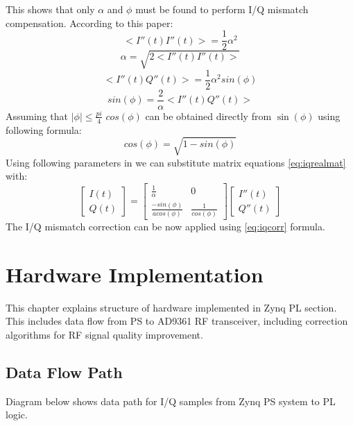 \documentclass[en,printmode]{mgr}
\begin{document}
		This shows that only $\alpha$ and $\phi$ must be found to perform I/Q mismatch
		compensation. According to this paper:
		\[
			<I''(t)I''(t)> = \frac{1}{2}\alpha^2
		\]
		\[
			\alpha = \sqrt{2<I''(t)I''(t)>}
		\]
		\[
			<I''(t)Q''(t)> = \frac{1}{2}\alpha^2sin(\phi)
		\]
		\[
			sin(\phi)= \frac{2}{\alpha}<I''(t)Q''(t)>
		\]
		Assuming that $|\phi| \leq \frac{pi}{4}$ $cos(\phi)$ can be obtained directly from
		$\sin(\phi)$ using following formula:
		\[
		 	cos(\phi) = \sqrt{1-sin(\phi)}
		\]
		Using following parameters in we can substitute matrix equations \ref{eq:iqrealmat} with:
		\begin{equation}
			\begin{bmatrix} 
				I(t) \\
				Q(t)
			\end{bmatrix}
			=
			\begin{bmatrix}
				\frac{1}{\alpha} & 0 \\
				\frac{-sin(\phi)}{acos(\phi)} & \frac{1}{cos(\phi)}
			\end{bmatrix}
			\begin{bmatrix}
				I''(t) \\
				Q''(t)
			\end{bmatrix}\label{eq:iqcorr}
		\end{equation}
		The I/Q mismatch correction  can be now applied using \ref{eq:iqcorr} formula.
	
\chapter{Hardware Implementation}
	This chapter explains structure of hardware implemented in Zynq PL section. This includes data flow
	from PS to AD9361 RF transceiver, including correction algorithms for RF signal quality improvement.
	
	\section{Data Flow Path}
	Diagram below shows data path for I/Q samples from Zynq PS system to PL logic.
	
\end{document}
